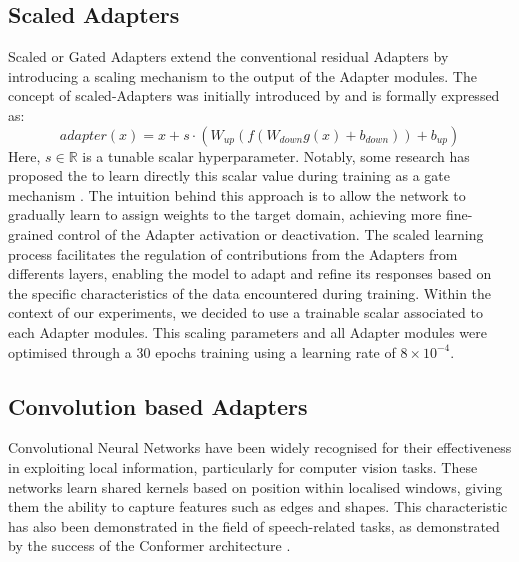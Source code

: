 \subsection{Scaled Adapters}
Scaled or Gated Adapters extend the conventional residual Adapters by introducing a scaling mechanism to the output of the Adapter modules. The concept of scaled-Adapters was initially introduced by \cite{he2022towards} and is formally expressed as:
\begin{equation}
    adapter(x) = x + s \cdot (W_{up}(f(W_{down}g(x) + b_{down})) + b_{up})    
\end{equation}
Here, $s \in \mathbb{R}$ is a tunable scalar hyperparameter. Notably, some research has proposed the to learn directly this scalar value during training as a gate mechanism \cite{mao-etal-2022-unipelt}. The intuition behind this approach is to allow the network to gradually learn to assign weights to the target domain, achieving more fine-grained control of the Adapter activation or deactivation. The scaled learning process facilitates the regulation of contributions from the Adapters from differents layers, enabling the model to adapt and refine its responses based on the specific characteristics of the data encountered during training.
Within the context of our experiments, we decided to use a trainable scalar associated to each Adapter modules. This scaling parameters and all Adapter modules were optimised through a 30 epochs training using a learning rate of $8 \times 10^{-4}$.

\subsection{Convolution based Adapters}
Convolutional Neural Networks have been widely recognised for their effectiveness in exploiting local information, particularly for computer vision tasks. These networks learn shared kernels based on position within localised windows, giving them the ability to capture features such as edges and shapes. This characteristic has also been demonstrated in the field of speech-related tasks, as demonstrated by the success of the Conformer architecture \cite{gulati2020conformer}.

